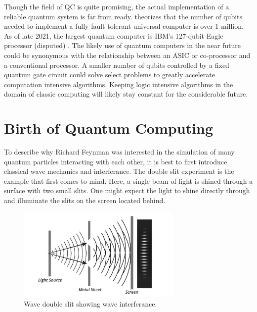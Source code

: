 \documentclass[conference]{IEEEtran}
\begin{document}
Though the field of QC is quite promising, the actual implementation of a reliable quantum system is far from ready. \cite{b1} theorizes that the number of qubits needed to implement a fully fault-tolerant universal computer is over 1 million. As of late 2021, the largest quantum computer is IBM's 127-qubit Eagle processor (disputed) \cite{b3}. The likely use of quantum computers in the near future could be synonymous with the relationship between an ASIC or co-processor and a conventional processor. A smaller number of qubits controlled by a fixed quantum gate circuit could solve select problems to greatly accelerate computation intensive algorithms. Keeping logic intensive algorithms in the domain of classic computing will likely stay constant for the considerable future. 

\section{Birth of Quantum Computing}

To describe why Richard Feynman was interested in the simulation of many quantum particles interacting with each other, it is best to first introduce classical wave mechanics and interferance. The double slit experiment is the example that first comes to mind. Here, a single beam of light is shined through a surface with two small slits. One might expect the light to shine directly through and illuminate the slits on the screen located behind.

\begin{figure}[htbp]
\centerline{\includegraphics[width=8cm]{double_slit_wave}}
\caption{Wave double slit showing wave interferance.}
\label{wave_slit}
\end{figure}
\end{document}
